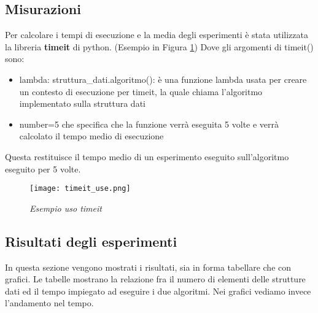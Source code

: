 \documentclass{article}
\begin{document}
\subsection{Misurazioni}
Per calcolare i tempi di esecuzione e la media degli esperimenti è stata utilizzata la libreria \textbf{timeit} di python. (Esempio in Figura \ref{timeit_ex})
Dove gli argomenti di timeit() sono:
\begin{itemize}
    \item lambda: struttura\_dati.algoritmo(): è una funzione lambda usata per creare un contesto di esecuzione per timeit, la quale chiama l'algoritmo implementato sulla struttura dati 
    \item number=5 che specifica che la funzione verrà eseguita 5 volte e verrà calcolato il tempo medio di esecuzione
 \end{itemize}
Questa restituisce il tempo medio di un esperimento eseguito sull'algoritmo eseguito per 5 volte.
\begin{figure}[H]
\texttt{[image: timeit\_use.png]}
\caption{\textit{Esempio uso timeit}}
\label{timeit_ex}
\end{figure}
\newpage
\subsection{Risultati degli esperimenti}
In questa sezione vengono mostrati i risultati, sia in forma tabellare che con grafici.
Le tabelle mostrano la relazione fra il numero di elementi delle strutture dati ed il tempo impiegato ad eseguire i due algoritmi.
Nei grafici vediamo invece l'andamento nel tempo.
\end{document}
